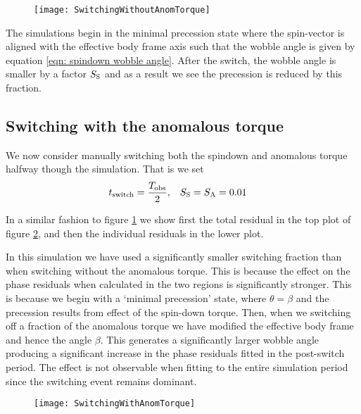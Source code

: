 \documentclass[../full_thesis/full_thesis.tex]{subfiles}
\begin{document}
\begin{figure}[htb]
\texttt{[image: SwitchingWithoutAnomTorque]}
\caption{}
\label{fig: switching without anom}
\end{figure}

The simulations begin in the minimal precession state where the spin-vector
is aligned with the effective body frame axis such that the wobble angle is given
by equation \eqref{eqn: spindown wobble angle}. After the switch, the wobble
angle is smaller by a factor $S_{\mathrm{S}}$ and as a result we see the precession is
reduced by this fraction.


\subsection{Switching with the anomalous torque}
We now consider manually switching both the spindown and anomalous torque
halfway though the simulation.  That is we set
\begin{align}
    t_{\mathrm{switch}} = \frac{T_{\textrm{obs}}}{2}, &&& S_{\mathrm{S}} = S_{\mathrm{A}} = 0.01
\end{align}

In a similar fashion to figure \ref{fig: switching without anom} we show first
the total residual in the top plot of figure \ref{fig: switching with anom}, and
then the individual residuals in the lower plot.

In this simulation we have used a significantly smaller switching fraction 
than when switching without the anomalous torque. This is because the effect 
on the phase residuals when calculated in the two regions is significantly
stronger. This is because we begin with a `minimal precession' state, where
$\theta = \beta$ and the precession results from effect of the spin-down torque.
Then, when we switching off a fraction of the anomalous torque we have modified
the effective body frame and hence the angle $\beta$. This generates a significantly
larger wobble angle producing a significant increase in the phase residuals
fitted in the post-switch period. The effect is not observable when fitting
to the entire simulation period since the switching event remains dominant.

\begin{figure}[htb]
\texttt{[image: SwitchingWithAnomTorque]}
\caption{}
\label{fig: switching with anom}
\end{figure}
\end{document}
